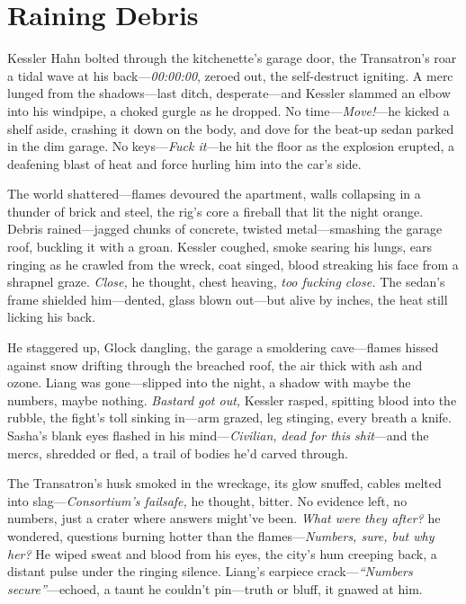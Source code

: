 \documentclass[12pt]{book}
\begin{document}
\section{Raining Debris}

Kessler Hahn bolted through the kitchenette’s garage door, the Transatron’s roar a tidal wave at his back—\textit{00:00:00}, zeroed out, the self-destruct igniting. A merc lunged from the shadows—last ditch, desperate—and Kessler slammed an elbow into his windpipe, a choked gurgle as he dropped. No time—\textit{Move!}—he kicked a shelf aside, crashing it down on the body, and dove for the beat-up sedan parked in the dim garage. No keys—\textit{Fuck it}—he hit the floor as the explosion erupted, a deafening blast of heat and force hurling him into the car’s side.

The world shattered—flames devoured the apartment, walls collapsing in a thunder of brick and steel, the rig’s core a fireball that lit the night orange. Debris rained—jagged chunks of concrete, twisted metal—smashing the garage roof, buckling it with a groan. Kessler coughed, smoke searing his lungs, ears ringing as he crawled from the wreck, coat singed, blood streaking his face from a shrapnel graze. \textit{Close,} he thought, chest heaving, \textit{too fucking close.} The sedan’s frame shielded him—dented, glass blown out—but alive by inches, the heat still licking his back.

He staggered up, Glock dangling, the garage a smoldering cave—flames hissed against snow drifting through the breached roof, the air thick with ash and ozone. Liang was gone—slipped into the night, a shadow with maybe the numbers, maybe nothing. \textit{Bastard got out,} Kessler rasped, spitting blood into the rubble, the fight’s toll sinking in—arm grazed, leg stinging, every breath a knife. Sasha’s blank eyes flashed in his mind—\textit{Civilian, dead for this shit}—and the mercs, shredded or fled, a trail of bodies he’d carved through.

The Transatron’s husk smoked in the wreckage, its glow snuffed, cables melted into slag—\textit{Consortium’s failsafe,} he thought, bitter. No evidence left, no numbers, just a crater where answers might’ve been. \textit{What were they after?} he wondered, questions burning hotter than the flames—\textit{Numbers, sure, but why her?} He wiped sweat and blood from his eyes, the city’s hum creeping back, a distant pulse under the ringing silence. Liang’s earpiece crack—\textit{“Numbers secure”}—echoed, a taunt he couldn’t pin—truth or bluff, it gnawed at him.
\end{document}
